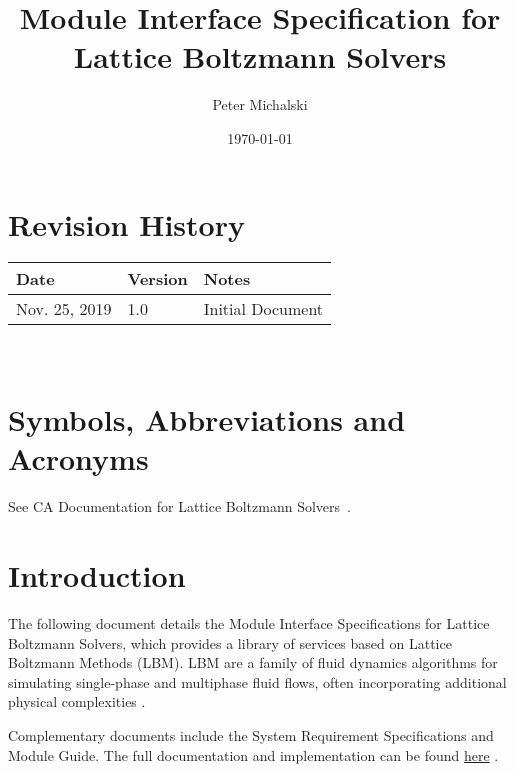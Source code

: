 \documentclass[12pt, titlepage]{article}
\newcommand{\famname}{Lattice Boltzmann Solvers}
\begin{document}
\title{Module Interface Specification for \famname}

\author{Peter Michalski}

\date{\today}

\maketitle


\section{Revision History} \label{MISREVHISTORY}

\begin{tabularx}{\textwidth}{p{3cm}p{2cm}X}
\toprule {\bf Date} & {\bf Version} & {\bf Notes}\\
\midrule
Nov. 25, 2019 & 1.0 & Initial Document\\
\bottomrule
\end{tabularx}

~\newpage

\section{Symbols, Abbreviations and Acronyms}

See CA Documentation for \famname \ \citep{LBM_CA_PM}.

\newpage

\tableofcontents

\newpage


\section{Introduction}

The following document details the Module Interface Specifications for
\famname , which provides a library of services based on Lattice Boltzmann Methods (LBM).
LBM are a family of fluid dynamics algorithms for simulating single-phase and multiphase fluid flows, often incorporating additional physical complexities \citep{chen1998lattice}.

Complementary documents include the System Requirement Specifications
and Module Guide.  The full documentation and implementation can be
found \href{https://github.com/peter-michalski/LatticeBoltzmannSolvers}{here} \citep{LBM_PM}.
\end{document}
